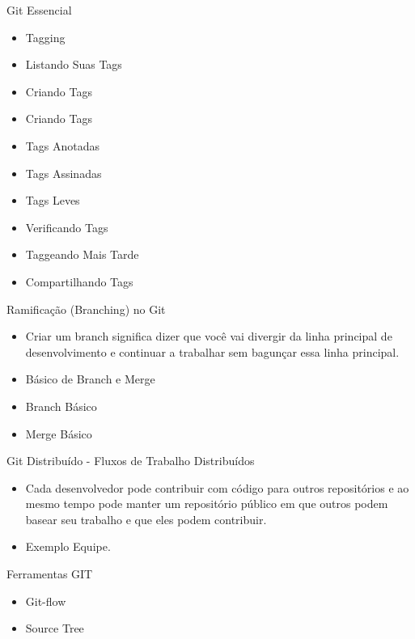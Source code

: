 \documentclass[t]{beamer}
\begin{document}
\begin{frame} {Git Essencial}
	\begin{itemize}
		\item Tagging
		\item Listando Suas Tags
		\item Criando Tags
		\item Criando Tags
		\item Tags Anotadas
		\item Tags Assinadas
		\item Tags Leves
		\item Verificando Tags
		\item Taggeando Mais Tarde
		\item Compartilhando Tags
	\end{itemize}
\end{frame}


\begin{frame} {Ramificação (Branching) no Git}
	\begin{itemize}
	\item Criar um branch significa dizer que você vai divergir da linha principal de desenvolvimento e continuar a trabalhar sem bagunçar essa linha principal.
	\item Básico de Branch e Merge
	\item Branch Básico
	\item Merge Básico
	\end{itemize}
	
\end{frame}		
	
\begin{frame} {Git Distribuído - Fluxos de Trabalho Distribuídos}
	\begin{itemize}
		 \item Cada desenvolvedor pode contribuir com código para outros repositórios e ao mesmo tempo pode manter um repositório público em que outros podem basear seu trabalho e que eles podem contribuir. 
		 \item Exemplo Equipe.
	\end{itemize}
	
\end{frame}			
	
\begin{frame} {Ferramentas GIT}
	\begin{itemize}
		\item Git-flow
		\item Source Tree
	\end{itemize}	
\end{frame}		
	
\end{document}
